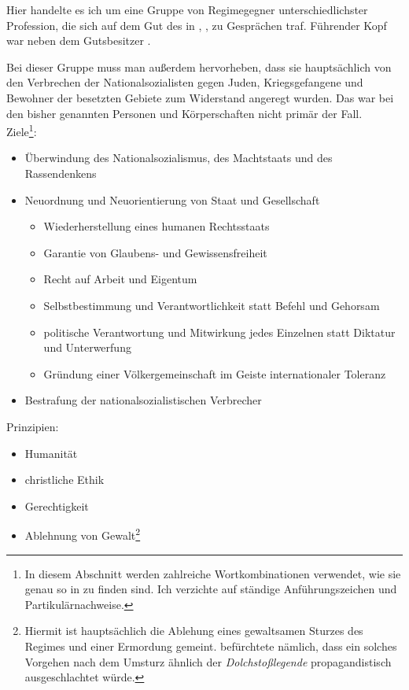 Hier handelte es ich um eine Gruppe von Regimegegner
unterschiedlichster Profession, die sich auf dem Gut des  in
, , zu Gesprächen traf. Führender
Kopf war neben dem Gutsbesitzer .

Bei dieser Gruppe muss man außerdem hervorheben, dass sie
hauptsächlich von den Verbrechen der Nationalsozialisten gegen Juden,
Kriegsgefangene und Bewohner der besetzten Gebiete zum Widerstand
angeregt wurden. Das war bei den bisher genannten Personen und
Körperschaften nicht primär der Fall.\\

\noindent Ziele\footnote{In diesem Abschnitt werden zahlreiche
Wortkombinationen verwendet, wie sie genau so in
\cite[236-238]{GeschDrReich} zu finden sind. Ich verzichte auf
ständige Anführungszeichen und Partikulärnachweise.}:

\begin{itemize}
\item Überwindung des Nationalsozialismus, des Machtstaats und des
Rassendenkens

\item Neuordnung und Neuorientierung von Staat und Gesellschaft
\begin{itemize}
\item Wiederherstellung eines humanen Rechtsstaats
\item Garantie von Glaubens- und Gewissensfreiheit
\item Recht auf Arbeit und Eigentum
\item Selbstbestimmung und Verantwortlichkeit statt Befehl und
Gehorsam
\item politische Verantwortung und Mitwirkung jedes Einzelnen statt
Diktatur und Unterwerfung
\item Gründung einer Völkergemeinschaft im Geiste internationaler
Toleranz
\end{itemize}

\item Bestrafung der nationalsozialistischen Verbrecher
\end{itemize}

\noindent Prinzipien:

\begin{itemize}
\item Humanität
\item christliche Ethik
\item Gerechtigkeit
\item Ablehnung von Gewalt\footnote{Hiermit ist hauptsächlich die
Ablehung eines gewaltsamen Sturzes des Regimes und einer Ermordung
 gemeint.  befürchtete nämlich, dass ein solches Vorgehen nach dem
Umsturz ähnlich der \emph{Dolchstoßlegende}
propagandistisch ausgeschlachtet würde.}
\end{itemize}


